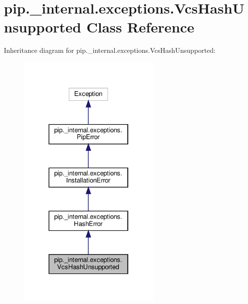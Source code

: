 \hypertarget{classpip_1_1__internal_1_1exceptions_1_1VcsHashUnsupported}{}\section{pip.\+\_\+internal.\+exceptions.\+Vcs\+Hash\+Unsupported Class Reference}
\label{classpip_1_1__internal_1_1exceptions_1_1VcsHashUnsupported}


Inheritance diagram for pip.\+\_\+internal.\+exceptions.\+Vcs\+Hash\+Unsupported\+:
\nopagebreak
\begin{figure}[H]
\begin{center}
\leavevmode
\includegraphics[width=202pt]{classpip_1_1__internal_1_1exceptions_1_1VcsHashUnsupported__inherit__graph}
\end{center}
\end{figure}


